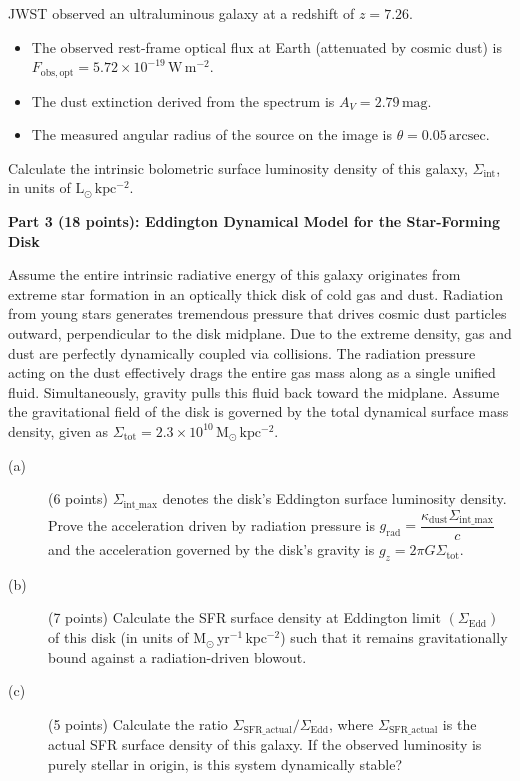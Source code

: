 JWST observed an ultraluminous galaxy at a redshift of $z = 7.26$.
\begin{itemize}
\item The observed rest-frame optical flux at Earth (attenuated by cosmic
  dust) is $F_{\mathrm{obs,opt}} = 5.72 \times 10^{-19}\,\mathrm{W\,m^{-2}}$.
\item The dust extinction derived from the spectrum is
  $A_V = 2.79\,\mathrm{mag}$.
\item The measured angular radius of the source on the image is
  $\theta = 0.05\,\mathrm{arcsec}$.
\end{itemize}
Calculate the intrinsic bolometric surface luminosity density of this galaxy,
$\Sigma_{\mathrm{int}}$, in units of $\mathrm{L_\odot\,kpc^{-2}}$.

\medskip\noindent\textbf{Part 3 (18 points): Eddington Dynamical Model for the Star-Forming Disk}

Assume the entire intrinsic radiative energy of this galaxy originates from
extreme star formation in an optically thick disk of cold gas and dust.
Radiation from young stars generates tremendous pressure that drives cosmic
dust particles outward, perpendicular to the disk midplane. Due to the extreme
density, gas and dust are perfectly dynamically coupled via collisions. The
radiation pressure acting on the dust effectively drags the entire gas mass
along as a single unified fluid. Simultaneously, gravity pulls this fluid back
toward the midplane. Assume the gravitational field of the disk is governed by
the total dynamical surface mass density, given as
$\Sigma_{\mathrm{tot}} = 2.3 \times 10^{10}\,\mathrm{M_\odot\,kpc^{-2}}$.

\begin{description}
\item[(a)] (6 points) $\Sigma_{\mathrm{int\_max}}$ denotes the disk's
  Eddington surface luminosity density. Prove the acceleration driven by
  radiation pressure is
  $g_{\mathrm{rad}} = \dfrac{\kappa_{\mathrm{dust}}\Sigma_{\mathrm{int\_max}}}{c}$
  and the acceleration governed by the disk's gravity is
  $g_z = 2\pi G \Sigma_{\mathrm{tot}}$.
\item[(b)] (7 points) Calculate the SFR surface density at Eddington limit
  $(\Sigma_{\mathrm{Edd}})$ of this disk (in units of
  $\mathrm{M_\odot\,yr^{-1}\,kpc^{-2}}$) such that it remains gravitationally
  bound against a radiation-driven blowout.
\item[(c)] (5 points) Calculate the ratio
  $\Sigma_{\mathrm{SFR\_actual}}/\Sigma_{\mathrm{Edd}}$, where
  $\Sigma_{\mathrm{SFR\_actual}}$ is the actual SFR surface density of this
  galaxy. If the observed luminosity is purely stellar in origin, is this
  system dynamically stable?
\end{description}

